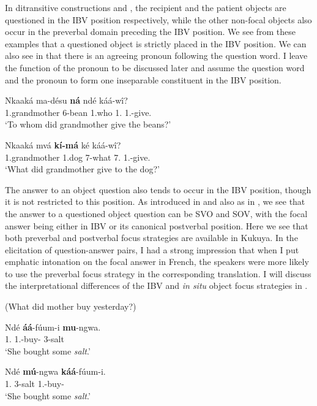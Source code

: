 \documentclass[output=paper,colorlinks,citecolor=brown,
]{langscibook}
\begin{document}
In ditransitive constructions  and , the recipient and the patient objects are questioned in the IBV position respectively, while the other non-focal objects also occur in the preverbal domain preceding the IBV position. We see from these examples that a questioned object is strictly placed in the IBV position. We can also see in  that there is an agreeing pronoun following the question word. I leave the function of the pronoun to be discussed later and assume the question word and the pronoun to form one inseparable constituent in the IBV position.
\begin{exe}
    \ex \label{20}
    \begin{xlist}
\ex
\label{20a}
\gll
Nkaaká ma-désu \textbf{ná} ndé káá-wî?\\
1.grandmother 6-bean 1.who 1.\Pro{} 1\Sm{}.\Pst{}-give.\Pst{}\\
\trans ‘To whom did grandmother give the beans?’

\ex
\label{20b}
\gll
Nkaaká mvá \textbf{kí-má} k\'{e} káá-wî?\\
1.grandmother 1.dog 7-what 7.\Pro{} 1\Sm{}.\Pst{}-give.\Pst{}\\
\trans ‘What did grandmother give to the dog?’

    \end{xlist}
\end{exe}
The answer to an object question also tends to occur in the IBV position, though it is not restricted to this position. As introduced in  and also as in , we see that the answer to a questioned object question can be SVO and SOV, with the focal answer being either in IBV or its canonical postverbal position. Here we see that both preverbal and postverbal focus strategies are available in Kukuya. In the elicitation of question-answer pairs, I had a strong impression that when I put emphatic intonation on the focal answer in French, the speakers were more likely to use the preverbal focus strategy in the corresponding translation. I will discuss the interpretational differences of the IBV and \textit{in situ} object focus strategies in . 
\begin{exe}
    \ex (What did mother buy yesterday?)\label{21}
    \begin{xlist}
\ex
\label{21a}
\gll
Ndé \textbf{áá}-fúum-i \textbf{mu}-ngwa.\\
1.\Pro{} 1\Sm{}.\Pst{}-buy-\Pst{} 3-salt\\
\trans ‘She bought some \textit{salt}.’

\ex
\label{21b}
\gll
Ndé \textbf{mú}-ngwa \textbf{káá}-fúum-i.\\
1.\Pro{} 3-salt 1\Sm{}.\Pst{}-buy-\Pst{}\\
\trans ‘She bought some \textit{salt}.’

    \end{xlist}
\end{exe} 
\end{document}

